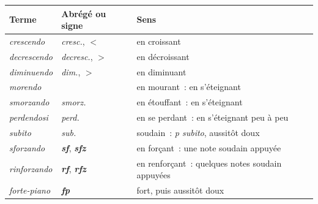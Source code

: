 \begin{tabular}{@{}l l l@{}}
\toprule
\textbf{Terme} & \textbf{Abrégé ou signe} & \textbf{Sens} \\
\midrule
\emph{crescendo} & \emph{cresc.}, $<$ & en croissant \\
\emph{decrescendo} & \emph{decresc.}, $>$ & en décroissant \\
\emph{diminuendo} & \emph{dim.}, $>$ & en diminuant \\
\emph{morendo} &  & en mourant~: en s'éteignant \\
\emph{smorzando} & \emph{smorz.} & en étouffant~: en s'éteignant \\
\emph{perdendosi} & \emph{perd.} & en se perdant~: en s'éteignant peu à peu \\
\emph{subito} & \emph{sub.} & soudain~: \emph{p subito}, aussitôt doux \\
\emph{sforzando} & \textbf{\emph{sf}}, \textbf{\emph{sfz}} & en forçant~: une note soudain appuyée \\
\emph{rinforzando} & \textbf{\emph{rf}}, \textbf{\emph{rfz}} & en renforçant~: quelques notes soudain appuyées \\
\emph{forte-piano} & \textbf{\emph{fp}} & fort, puis aussitôt doux \\
\bottomrule
\end{tabular}
